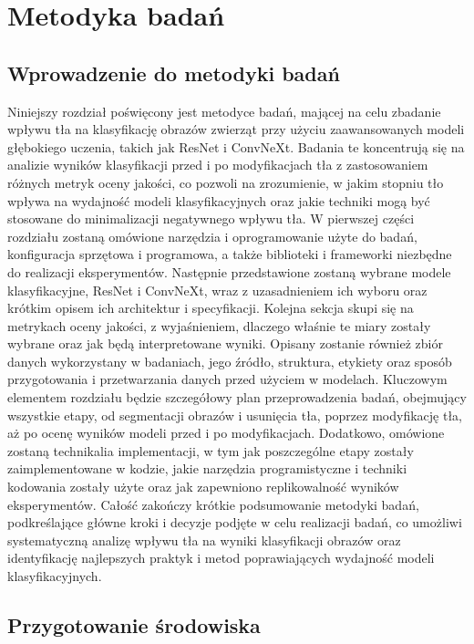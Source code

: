 \chapter*{Metodyka badań}

\section*{Wprowadzenie do metodyki badań}

Niniejszy rozdział poświęcony jest metodyce badań, mającej na celu zbadanie wpływu tła na klasyfikację 
obrazów zwierząt przy użyciu zaawansowanych modeli głębokiego uczenia, takich jak ResNet i ConvNeXt. 
Badania te koncentrują się na analizie wyników klasyfikacji przed i po modyfikacjach tła z 
zastosowaniem różnych metryk oceny jakości, co pozwoli na zrozumienie, w jakim stopniu tło wpływa 
na wydajność modeli klasyfikacyjnych oraz jakie techniki mogą być stosowane do minimalizacji 
negatywnego wpływu tła. W pierwszej części rozdziału zostaną omówione narzędzia i oprogramowanie 
użyte do badań, konfiguracja sprzętowa i programowa, a także biblioteki i frameworki niezbędne do 
realizacji eksperymentów. Następnie przedstawione zostaną wybrane modele klasyfikacyjne, ResNet i 
ConvNeXt, wraz z uzasadnieniem ich wyboru oraz krótkim opisem ich architektur i specyfikacji. 
Kolejna sekcja skupi się na metrykach oceny jakości, z wyjaśnieniem, dlaczego właśnie te miary 
zostały wybrane oraz jak będą interpretowane wyniki. Opisany zostanie również zbiór danych 
wykorzystany w badaniach, jego źródło, struktura, etykiety oraz sposób przygotowania i 
przetwarzania danych przed użyciem w modelach. Kluczowym elementem rozdziału będzie szczegółowy 
plan przeprowadzenia badań, obejmujący wszystkie etapy, od segmentacji obrazów i usunięcia tła, 
poprzez modyfikację tła, aż po ocenę wyników modeli przed i po modyfikacjach. Dodatkowo, omówione 
zostaną technikalia implementacji, w tym jak poszczególne etapy zostały zaimplementowane w kodzie, 
jakie narzędzia programistyczne i techniki kodowania zostały użyte oraz jak zapewniono 
replikowalność wyników eksperymentów. Całość zakończy krótkie podsumowanie metodyki badań, 
podkreślające główne kroki i decyzje podjęte w celu realizacji badań, co umożliwi systematyczną 
analizę wpływu tła na wyniki klasyfikacji obrazów oraz identyfikację najlepszych praktyk i metod 
poprawiających wydajność modeli klasyfikacyjnych.

\section*{Przygotowanie środowiska}

